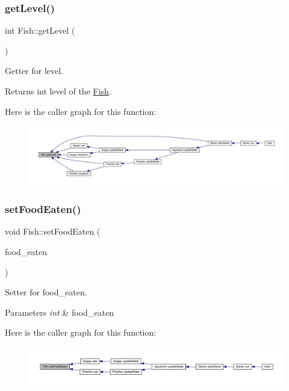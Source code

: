 \subsubsection{\texorpdfstring{get\+Level()}{getLevel()}}
{\footnotesize\ttfamily int Fish\+::get\+Level (\begin{DoxyParamCaption}{ }\end{DoxyParamCaption})}



Getter for level. 

\begin{DoxyReturn}{Returns}
int level of the \mbox{\hyperlink{class_fish}{Fish}}. 
\end{DoxyReturn}
Here is the caller graph for this function\+:\nopagebreak
\begin{figure}[H]
\begin{center}
\leavevmode
\includegraphics[width=350pt]{class_fish_a3f9ad26c3d1dfbc3d1334065691d55da_icgraph}
\end{center}
\end{figure}
\mbox{\label{class_fish_a37379e4c783602bd7c3d475a67167c11}} 
\subsubsection{\texorpdfstring{set\+Food\+Eaten()}{setFoodEaten()}}
{\footnotesize\ttfamily void Fish\+::set\+Food\+Eaten (\begin{DoxyParamCaption}\item[{int}]{food\+\_\+eaten }\end{DoxyParamCaption})}



Setter for food\+\_\+eaten. 


\begin{DoxyParams}{Parameters}
{\em int} & food\+\_\+eaten \\
\hline
\end{DoxyParams}
Here is the caller graph for this function\+:\nopagebreak
\begin{figure}[H]
\begin{center}
\leavevmode
\includegraphics[width=350pt]{class_fish_a37379e4c783602bd7c3d475a67167c11_icgraph}
\end{center}
\end{figure}
\mbox{\label{class_fish_a8b24063bf538f0502cf38ce5859aec8e}} 
